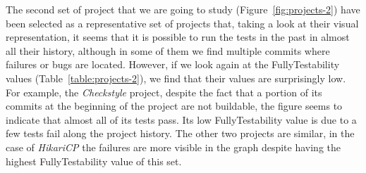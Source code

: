 
The second set of project that we are going to study (Figure~\ref{fig:projects-2}) have been selected as a representative set of projects that, taking a look at their visual representation, it seems that it is possible to run the tests in the past in almost all their history, although in some of them we find multiple commits where failures or bugs are located.
However, if we look again at the FullyTestability values (Table~\ref{table:projects-2}), we find that their values are surprisingly low. 
For example, the \textit{Checkstyle} project, despite the fact that a portion of its commits at the beginning of the project are not buildable, the figure seems to indicate that almost all of its tests pass. 
Its low FullyTestability value is due to a few tests fail along the project history.
The other two projects are similar, in the case of \textit{HikariCP} the failures are more visible in the graph despite having the highest FullyTestability value of this set.


